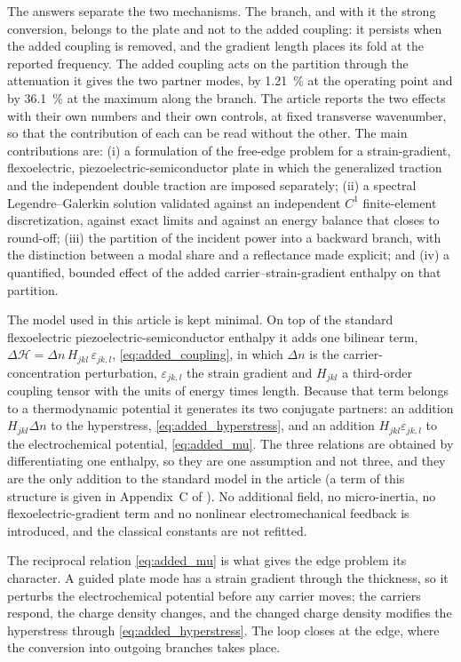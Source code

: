 The answers separate the two mechanisms.  The branch, and with it the strong
conversion, belongs to the plate and not to the added coupling: it persists when the added coupling is removed, and the gradient length places its fold at the reported
frequency.  The added coupling acts on the partition through the attenuation it
gives the two partner modes, by \SI{1.21}{\percent} at the operating point and
by \SI{36.1}{\percent} at the maximum along the branch.  The article reports the
two effects with their own numbers and their own controls, at fixed transverse
wavenumber, so that the contribution of each can be read without the other.
The main contributions are:
(i) a formulation of the free-edge problem for a strain-gradient, flexoelectric,
piezoelectric-semiconductor plate in which the generalized traction and the
independent double traction are imposed separately;
(ii) a spectral Legendre--Galerkin solution validated against an independent
$C^{1}$ finite-element discretization, against exact limits and against an
energy balance that closes to round-off;
(iii) the partition of the incident power into a backward branch, with the
distinction between a modal share and a reflectance made explicit; and
(iv) a quantified, bounded effect of the added carrier--strain-gradient
enthalpy on that partition.

\label{sec:intro_coupling}
The model used in this article is kept minimal.  On top of the standard
flexoelectric piezoelectric-semiconductor enthalpy it adds one
bilinear term, $\Delta\mathcal{H}=\Delta n\,H_{jkl}\,\varepsilon_{jk,l}$,
\eqref{eq:added_coupling}, in which $\Delta n$ is the carrier-concentration
perturbation, $\varepsilon_{jk,l}$ the strain gradient and $H_{jkl}$ a
third-order coupling tensor with the units of energy times length.  Because that
term belongs to a thermodynamic potential it generates its two conjugate
partners: an addition $H_{jkl}\Delta n$ to the hyperstress,
\eqref{eq:added_hyperstress}, and an addition $H_{jkl}\varepsilon_{jk,l}$ to the
electrochemical potential, \eqref{eq:added_mu}.  The three relations are
obtained by differentiating one enthalpy, so
they are one assumption and not three, and they are the only addition to the standard model in the
article (a term of this structure is given in Appendix~C of \cite{qu2025thermodynamic}).  No additional field, no micro-inertia, no flexoelectric-gradient term
and no nonlinear electromechanical feedback is introduced, and the classical
constants are not refitted.

The reciprocal relation \eqref{eq:added_mu} is what gives the edge problem
its character.  A guided plate mode has a strain gradient through the
thickness, so it perturbs the electrochemical potential before any carrier
moves; the carriers respond, the charge density changes, and the changed charge
density modifies the hyperstress through \eqref{eq:added_hyperstress}.  The loop
closes at the edge, where the conversion into outgoing branches takes place.

